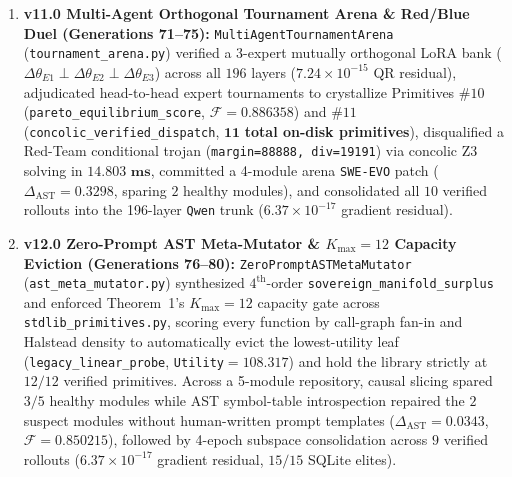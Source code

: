 \documentclass[10pt,twocolumn,letterpaper]{article}
\begin{document}
\begin{enumerate}
    \item \textbf{v11.0 Multi-Agent Orthogonal Tournament Arena \& Red/Blue Duel (Generations 71--75):} \texttt{MultiAgent\allowbreak Tournament\allowbreak Arena} (\texttt{tournament\_\allowbreak arena.py}) verified a 3-expert mutually orthogonal LoRA bank ($\Delta\theta_{E1}\perp\Delta\theta_{E2}\perp\Delta\theta_{E3}$) across all $196$ layers ($7.24\times 10^{-15}$ QR residual), adjudicated head-to-head expert tournaments to crystallize Primitives $\#10$ (\texttt{pareto\_\allowbreak equilibrium\_\allowbreak score}, $\mathcal{F}=0.886358$) and $\#11$ (\texttt{concolic\_\allowbreak verified\_\allowbreak dispatch}, $\mathbf{11}$ \textbf{total on-disk primitives}), disqualified a Red-Team conditional trojan (\texttt{margin=88888, div=19191}) via concolic Z3 solving in $\mathbf{14.803\text{ ms}}$, committed a 4-module arena \texttt{SWE-EVO} patch ($\Delta_{\text{AST}}=0.3298$, sparing $2$ healthy modules), and consolidated all $10$ verified rollouts into the 196-layer \texttt{Qwen} trunk ($6.37\times 10^{-17}$ gradient residual).
    \item \textbf{v12.0 Zero-Prompt AST Meta-Mutator \& $K_{\max}=12$ Capacity Eviction (Generations 76--80):} \texttt{ZeroPrompt\allowbreak ASTMeta\allowbreak Mutator} (\texttt{ast\_\allowbreak meta\_\allowbreak mutator.py}) synthesized $4^{\text{th}}$-order \texttt{sovereign\_\allowbreak manifold\_\allowbreak surplus} and enforced Theorem~1's $K_{\max}=12$ capacity gate across \texttt{stdlib\_\allowbreak primitives.py}, scoring every function by call-graph fan-in and Halstead density to automatically evict the lowest-utility leaf (\texttt{legacy\_\allowbreak linear\_\allowbreak probe}, \texttt{Utility}$=108.317$) and hold the library strictly at $12/12$ verified primitives. Across a 5-module repository, causal slicing spared $3/5$ healthy modules while AST symbol-table introspection repaired the $2$ suspect modules without human-written prompt templates ($\Delta_{\text{AST}}=0.0343$, $\mathcal{F}=0.850215$), followed by 4-epoch subspace consolidation across $9$ verified rollouts ($6.37\times 10^{-17}$ gradient residual, $15/15$ SQLite elites).

\end{enumerate}
\end{document}
